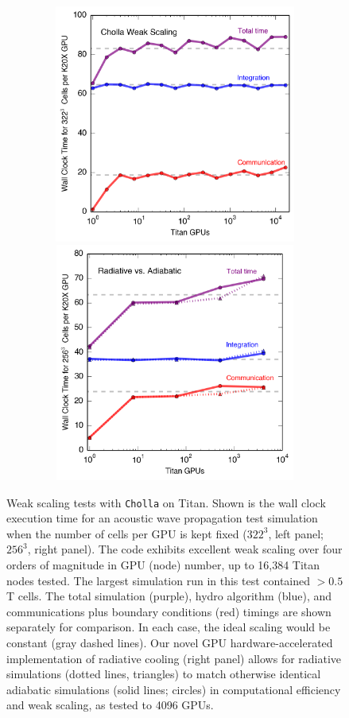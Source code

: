 \documentclass[11pt,letterpaper,english]{article}
\begin{document}
\begin{figure}[h]
\centering
\includegraphics[width=4.52in, height=3.08in, keepaspectratio=true]{weak_scaling_adiabatic.png}
\includegraphics[width=4.52in, height=3.08in, keepaspectratio=true]{weak_scaling_radiative.png}
\caption{Weak scaling tests with {\tt Cholla} on Titan. Shown is the wall clock
execution time for an acoustic wave propagation test simulation when the
number of cells per GPU is kept fixed ($322^3$, left panel; $256^3$, right panel).
The code exhibits excellent weak scaling over four orders of magnitude in GPU (node) number, up to
16,384 Titan nodes tested. The largest simulation run in this test contained
$>0.5$T cells. The total simulation (purple), hydro algorithm (blue), and communications plus boundary conditions (red) timings are shown separately for comparison. In each case, the ideal scaling would be constant (gray dashed lines). Our novel GPU hardware-accelerated 
implementation of radiative cooling (right panel) allows for radiative simulations (dotted lines, triangles) to match otherwise identical 
adiabatic simulations (solid lines; circles) in computational
efficiency and weak scaling, as tested to 4096 GPUs.}
\label{fig:weak_scaling}
\end{figure}
\end{document}
